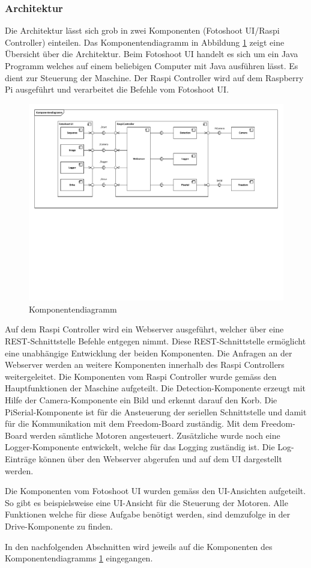 \subsubsection{Architektur}

Die Architektur lässt sich grob in zwei Komponenten (Fotoshoot UI/Raspi Controller) einteilen. Das Komponentendiagramm in Abbildung \ref{fig:komponentendiagramm} zeigt eine Übersicht über die Architektur. Beim Fotoshoot UI handelt es sich um ein Java Programm welches auf einem beliebigen Computer mit Java ausführen lässt. Es dient zur Steuerung der Maschine. Der Raspi Controller wird auf dem Raspberry Pi ausgeführt und verarbeitet die Befehle vom Fotoshoot UI.

\begin{figure}[h!]
	\centering
	\includegraphics[width=\linewidth]{../../fig/komponentendiagramm}
	\caption{Komponentendiagramm}
	\label{fig:komponentendiagramm}
\end{figure}

Auf dem Raspi Controller wird ein Webserver ausgeführt, welcher über eine REST-Schnittstelle Befehle entgegen nimmt. Diese REST-Schnittstelle ermöglicht eine unabhängige Entwicklung der beiden Komponenten. Die Anfragen an der Webserver werden an weitere Komponenten innerhalb des Raspi Controllers weitergeleitet. Die Komponenten vom Raspi Controller wurde gemäss den Hauptfunktionen der Maschine aufgeteilt. Die Detection-Komponente erzeugt mit Hilfe der Camera-Komponente ein Bild und erkennt darauf den Korb. Die PiSerial-Komponente ist für die Ansteuerung der seriellen Schnittstelle und damit für die Kommunikation mit dem Freedom-Board zuständig. Mit dem Freedom-Board werden sämtliche Motoren angesteuert. Zusätzliche wurde noch eine Logger-Komponente entwickelt, welche für das Logging zuständig ist. Die Log-Einträge können über den Webserver abgerufen und auf dem UI dargestellt werden.

Die Komponenten vom Fotoshoot UI wurden gemäss den UI-Ansichten aufgeteilt. So gibt es beispielsweise eine UI-Ansicht für die Steuerung der Motoren. Alle Funktionen welche für diese Aufgabe benötigt werden, sind demzufolge in der Drive-Komponente zu finden.

In den nachfolgenden Abschnitten wird jeweils auf die Komponenten des Komponentendiagramms \ref{fig:komponentendiagramm} eingegangen.